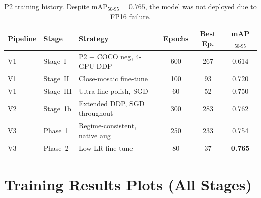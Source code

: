 \documentclass[12pt, titlepage]{article}
\begin{document}
\begin{table}[H]
  \centering
  \caption{P2 training history.  Despite mAP$_{50\text{-}95} = 0.765$,
    the model was not deployed due to FP16 failure.}
  \label{tab:p2_history}
  \small
  \begin{tabular}{@{}lllccc@{}}
    \toprule
    \textbf{Pipeline} & \textbf{Stage}    & \textbf{Strategy}             &
    \textbf{Epochs}   & \textbf{Best Ep.} & \textbf{mAP$_{50\text{-}95}$}                              \\
    \midrule
    V1                & Stage~I           & P2 + COCO neg, 4-GPU DDP      & 600 & 267 & 0.614          \\
    V1                & Stage~II          & Close-mosaic fine-tune        & 100 & 93  & 0.720          \\
    V1                & Stage~III         & Ultra-fine polish, SGD        & 60  & 52  & 0.750          \\
    V2                & Stage~1b          & Extended DDP, SGD throughout  & 300 & 283 & 0.762          \\
    V3                & Phase~1           & Regime-consistent, native aug & 250 & 233 & 0.754          \\
    V3                & Phase~2           & Low-LR fine-tune              & 80  & 37  & \textbf{0.765} \\
    \bottomrule
  \end{tabular}
\end{table}

\section{Training Results Plots (All Stages)}
\label{app:results_plots}
\end{document}
